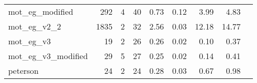 {\begin{tabular}{l|r|r|r|r|r|r|r|l}
mot\_eg\_modified                           & 292                                                                                               & 4                                                                                                & 40                                                                                                                   & 0.73                            & 0.12                    & {\color[HTML]{00009B} 3.99}    & 4.83                       \\
mot\_eg\_v2\_2                              & 1835                                                                                              & 2                                                                                                & 32                                                                                                                   & 2.56                            & 0.03                    & {\color[HTML]{00009B} 12.18}   & 14.77                      \\
mot\_eg\_v3                                 & 19                                                                                                & 2                                                                                                & 26                                                                                                                   & 0.26                            & 0.02                    & {\color[HTML]{00009B} 0.10}    & 0.37                       \\
mot\_eg\_v3\_modified                       & 29                                                                                                & 5                                                                                                & 27                                                                                                                   & 0.25                            & 0.02                    & {\color[HTML]{00009B} 0.14}    & 0.41                       \\
peterson                                    & 24                                                                                                & 2                                                                                                & 24                                                                                                                   & 0.28                            & 0.03                    & {\color[HTML]{00009B} 0.67}    & 0.98                       \\

\end{tabular}}
